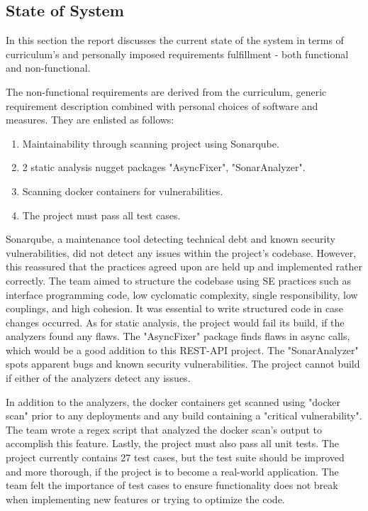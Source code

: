 \subsection{State of System}\label{stateofsystem}

In this section the report discusses the current state of the system in terms of curriculum's and personally imposed requirements fulfillment - both functional and non-functional. 



The non-functional requirements are derived from the curriculum, generic requirement description combined with personal choices of software and measures. They are enlisted as follows:

\begin{enumerate}[noitemsep]
  \item Maintainability through scanning project using Sonarqube.
  \item 2 static analysis nugget packages "AsyncFixer", "SonarAnalyzer".
  \item Scanning docker containers for vulnerabilities.
  \item The project must pass all test cases.
\end{enumerate}

Sonarqube, a maintenance tool detecting technical debt and known security vulnerabilities, did not detect any issues within the project's codebase. However, this reassured that the practices agreed upon are held up and implemented rather correctly. The team aimed to structure the codebase using SE practices such as interface programming code, low cyclomatic complexity, single responsibility, low couplings, and high cohesion. It was essential to write structured code in case changes occurred. As for static analysis, the project would fail its build, if the analyzers found any flaws. The "AsyncFixer" package finds flaws in async calls, which would be a good addition to this REST-API project. The "SonarAnalyzer" spots apparent bugs and known security vulnerabilities. The project cannot build if either of the analyzers detect any issues. 
\vspace{3mm}

In addition to the analyzers, the docker containers get scanned using "docker scan" prior to any deployments and any build containing a "critical vulnerability". The team wrote a regex script\cite{script} that analyzed the docker scan's output to accomplish this feature. Lastly, the project must also pass all unit tests. The project currently contains 27 test cases, but the test suite should be improved and more thorough, if the project is to become a real-world application. The team felt the importance of test cases to ensure functionality does not break when implementing new features or trying to optimize the code.

